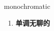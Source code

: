 
\begin{frame}
{\huge monochromatic}
\begin{center}
\begin{enumerate}\Large
  \item \textbf{单调无聊的}
\end{enumerate}
\end{center}
\end{frame}
